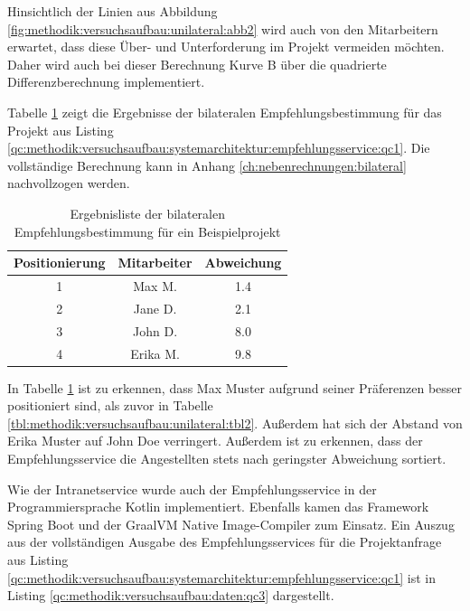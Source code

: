 Hinsichtlich der Linien aus Abbildung \ref{fig:methodik:versuchsaufbau:unilateral:abb2} wird auch von den Mitarbeitern erwartet, dass diese Über- und Unterforderung im Projekt vermeiden möchten. Daher wird auch bei dieser Berechnung Kurve B über die quadrierte Differenzberechnung implementiert.

Tabelle \ref{tbl:methodik:versuchsaufbau:bilateral:tbl2} zeigt die Ergebnisse der bilateralen Empfehlungsbestimmung für das Projekt aus Listing \ref{qc:methodik:versuchsaufbau:systemarchitektur:empfehlungsservice:qc1}. Die vollständige Berechnung kann in Anhang \ref{ch:nebenrechnungen:bilateral} nachvollzogen werden.

\begin{table}[h]
	\centering
	\begin{tabular}{c|c|c}
		\textbf{Positionierung} & \textbf{Mitarbeiter} & \textbf{Abweichung}\\
		\hline
		1 & Max M.   & 1.4\\
		2 & Jane D.  & 2.1\\
		3 & John D.  & 8.0\\
		4 & Erika M. & 9.8
	\end{tabular}
	\caption{Ergebnisliste der bilateralen Empfehlungsbestimmung für ein Beispielprojekt}
	\label{tbl:methodik:versuchsaufbau:bilateral:tbl2}
\end{table}

In Tabelle \ref{tbl:methodik:versuchsaufbau:bilateral:tbl2} ist zu erkennen, dass Max Muster aufgrund seiner Präferenzen besser positioniert sind, als zuvor in Tabelle \ref{tbl:methodik:versuchsaufbau:unilateral:tbl2}. Außerdem hat sich der Abstand von Erika Muster auf John Doe verringert. Außerdem ist zu erkennen, dass der Empfehlungsservice die Angestellten stets nach geringster Abweichung sortiert.

Wie der Intranetservice wurde auch der Empfehlungsservice in der Programmiersprache Kotlin implementiert. Ebenfalls kamen das Framework Spring Boot und der GraalVM Native Image-Compiler zum Einsatz. Ein Auszug aus der vollständigen Ausgabe des Empfehlungsservices für die Projektanfrage aus Listing \ref{qc:methodik:versuchsaufbau:systemarchitektur:empfehlungsservice:qc1} ist in Listing \ref{qc:methodik:versuchsaufbau:daten:qc3} dargestellt.



